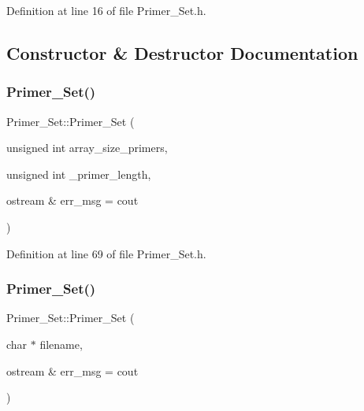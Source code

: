 Definition at line 16 of file Primer\+\_\+\+Set.\+h.



\subsection{Constructor \& Destructor Documentation}
\mbox{\label{class_primer___set_ab9db4a9ad37106aac40762b7b4d57d4f}} 
\subsubsection{\texorpdfstring{Primer\+\_\+\+Set()}{Primer\_Set()}\hspace{0.1cm}{\footnotesize\ttfamily [1/5]}}
{\footnotesize\ttfamily Primer\+\_\+\+Set\+::\+Primer\+\_\+\+Set (\begin{DoxyParamCaption}\item[{unsigned int}]{array\+\_\+size\+\_\+primers,  }\item[{unsigned int}]{\+\_\+primer\+\_\+length,  }\item[{ostream \&}]{err\+\_\+msg = {\ttfamily cout} }\end{DoxyParamCaption})}



Definition at line 69 of file Primer\+\_\+\+Set.\+h.

\mbox{\label{class_primer___set_ae81dafc2ac39deb5480f68dac440e88e}} 
\subsubsection{\texorpdfstring{Primer\+\_\+\+Set()}{Primer\_Set()}\hspace{0.1cm}{\footnotesize\ttfamily [2/5]}}
{\footnotesize\ttfamily Primer\+\_\+\+Set\+::\+Primer\+\_\+\+Set (\begin{DoxyParamCaption}\item[{char $\ast$}]{filename,  }\item[{ostream \&}]{err\+\_\+msg = {\ttfamily cout} }\end{DoxyParamCaption})}



